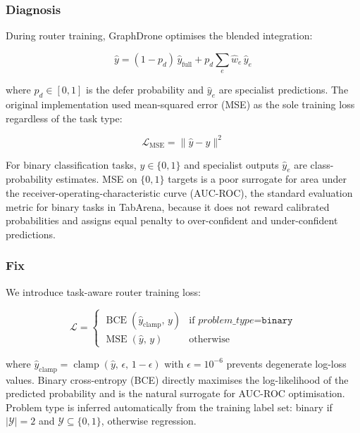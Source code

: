 \subsubsection{Diagnosis}

During router training, GraphDrone optimises the blended integration:

\begin{equation}
    \hat{y} = (1 - p_d)\,\hat{y}_{\text{full}}
            + p_d \sum_e \hat{w}_e\,\hat{y}_e
    \label{eq:blend}
\end{equation}

where $p_d \in [0,1]$ is the defer probability and $\hat{y}_e$ are
specialist predictions.
The original implementation used mean-squared error (MSE) as the sole
training loss regardless of the task type:

\begin{equation}
    \mathcal{L}_{\text{MSE}} = \|\hat{y} - y\|^2
    \label{eq:mse_loss}
\end{equation}

For binary classification tasks, $y \in \{0,1\}$ and specialist
outputs $\hat{y}_e$ are class-probability estimates.
MSE on $\{0,1\}$ targets is a poor surrogate for area under the
receiver-operating-characteristic curve (AUC-ROC), the standard
evaluation metric for binary tasks in TabArena, because it does not
reward calibrated probabilities and assigns equal penalty to
over-confident and under-confident predictions.

\subsubsection{Fix}

We introduce task-aware router training loss:

\begin{equation}
    \mathcal{L} =
    \begin{cases}
        \operatorname{BCE}\!\left(
            \hat{y}_{\text{clamp}},\, y
        \right) & \text{if } \textit{problem\_type} = \texttt{binary} \\[4pt]
        \operatorname{MSE}\!\left(\hat{y},\, y\right) & \text{otherwise}
    \end{cases}
    \label{eq:task_loss}
\end{equation}

where $\hat{y}_{\text{clamp}} = \operatorname{clamp}(\hat{y},\,
\epsilon,\, 1-\epsilon)$ with $\epsilon = 10^{-6}$ prevents
degenerate log-loss values.
Binary cross-entropy (BCE) directly maximises the log-likelihood of the
predicted probability and is the natural surrogate for AUC-ROC
optimisation.
Problem type is inferred automatically from the training label set:
binary if $|\mathcal{Y}| = 2$ and $\mathcal{Y} \subseteq \{0, 1\}$,
otherwise regression.


